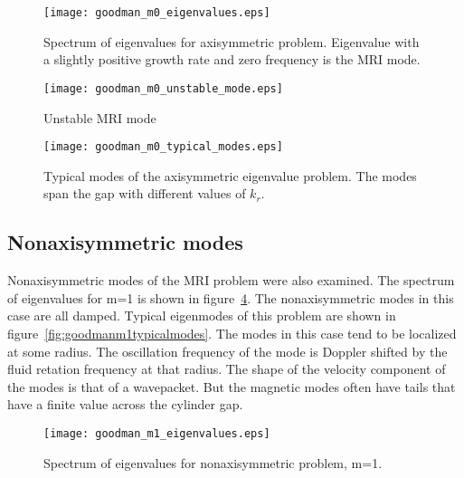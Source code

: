 \documentclass[letterpaper]{article}
\begin{document}
\begin{figure}
\begin{center}
\texttt{[image: goodman\_m0\_eigenvalues.eps]}
\caption{Spectrum of eigenvalues for axisymmetric problem.  Eigenvalue
  with a slightly positive growth rate and zero frequency is the MRI
  mode.}
\label{fig:goodmanm0eigenvalues}
\end{center}
\end{figure}


\begin{figure}
\begin{center}
\texttt{[image: goodman\_m0\_unstable\_mode.eps]}
\caption{Unstable MRI mode}
\label{fig:goodmanm0unstablemode}
\end{center}
\end{figure}

\begin{figure}
\begin{center}
\texttt{[image: goodman\_m0\_typical\_modes.eps]}
\caption{Typical modes of the axisymmetric eigenvalue problem.  The
  modes span the gap with different values of $k_r$.}
\label{fig:goodmanm0typicalmodes}
\end{center}
\end{figure}

\subsection{Nonaxisymmetric modes}

Nonaxisymmetric modes of the MRI problem were also examined.  The
spectrum of eigenvalues for m=1 is shown in
figure~\ref{fig:goodmanm1eigenvalues}.  The nonaxisymmetric modes in
this case are all damped.  Typical eigenmodes of this problem are
shown in figure~\ref{fig:goodmanm1typicalmodes}.  The modes in this
case tend to be localized at some radius.  The oscillation frequency
of the mode is Doppler shifted by the fluid retation frequency at that
radius.  The shape of the velocity component of the modes is that of a
wavepacket.  But the magnetic modes often have tails that have a
finite value across the cylinder gap.

\begin{figure}
\begin{center}
\texttt{[image: goodman\_m1\_eigenvalues.eps]}
\caption{Spectrum of eigenvalues for nonaxisymmetric problem, m=1.}
\label{fig:goodmanm1eigenvalues}
\end{center}
\end{figure}
\end{document}
